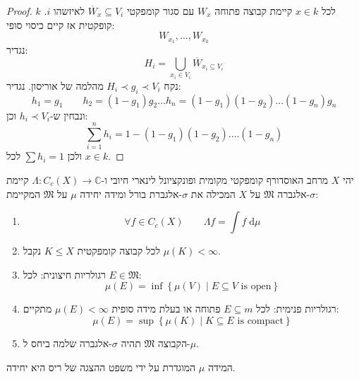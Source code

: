 \documentclass{tstextbook}
\begin{document}
\begin{proof}
לכל \(x \in k\) קיימת קבוצה פתוחה \(W_{x}\) עם סגור קומפקטי \(\overline{W}_{x}\subseteq V_{i}\) לאיזשהו \(i\). \(k\) קופקטית אז קיים כיסוי סופי:
$$W_{x_{1}},\dots,W_{x_{k}}$$
נגדיר:
$$H_{i}=\bigcup_{x_{i}\in V_{i}}\overline{W} _{x_{i}\subseteq V_{i}}$$
נקח \(H_{i}\prec g_{i}\prec V_{i}\) מהלמה של אוריסון. נגדיר:
$$h_{1}=g_{1}\qquad h_{2}=(1-g_{1})g_{2}\dots h_{n}=(1-g_{1})(1-g_{2})\dots(1-g_{n})g_{n}$$
ונבחין ש-\(h_{i}\prec V_{i}\) וכן:
$$\sum_{i=1}^{n} h_{i}= 1-(1-g_{1})(1-g_{2})\dots.(1-g_{n})$$
ולכן \(\sum h_{i}=1\) לכל \(x \in k\).

\end{proof}
\begin{theorem}
יהי \(X\) מרחב האוסדורף קומפקטי מקומית ופונקציונל לינארי חיובי ו-\(\Lambda:C_{c}(X)\to \mathbb{C}\) קיימת \(\sigma\)-אלגברה \(\mathfrak{M}\) על \(X\) המכילה את \(\sigma\)-אלגברת בורל ומידה יחידה \(\mu\) על \(\mathfrak{M}\) המקיימת:

  \begin{enumerate}
    \item $$\forall f \in C_{c}(X)\qquad \Lambda f=\int f \;\mathrm{d} \mu $$


    \item לכל קבוצה קומפקטית \(K\leq X\)  נקבל \(\mu(K)< \infty\). 


    \item רגולריות חיצונית: לכל \(E \in \mathfrak{M}\): 
$$\mu(E)=\inf \left\{  \mu(V) \mid E\subseteq V \text{ is open} \right\}$$


    \item רגולריות פנימית: לכל \(E \subseteq m\) פתוחה או בעלת מידה סופית \(\mu(E)<\infty\) מתקיים: 
$$\mu(E)= \sup \left\{  \mu(K)\mid K\subseteq E\text{ is compact}  \right\}$$


    \item הקבוצה \(\mathfrak{M}\) תהיה \(\sigma\)-אלגברה שלמה ביחס ל-\(\mu\). 


  \end{enumerate}
\end{theorem}
\begin{proposition}
המידה \(\mu\) המוגדרת על ידי משפט ההצגה של ריס היא יחידה.

\end{proposition}
\end{document}

